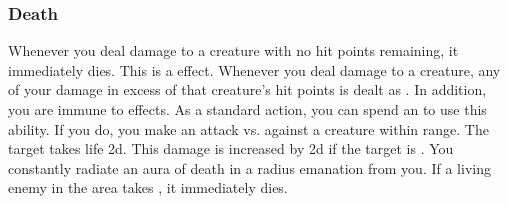         \subsubsection{Death}
             Whenever you deal damage to a creature with no hit points remaining, it immediately dies.
            This is a  effect.
             Whenever you deal damage to a creature, any of your damage in excess of that creature's hit points is dealt as .
            In addition, you are immune to  effects.
             As a standard action, you can spend an  to use this ability.
            If you do, you make an attack vs. against a creature within \rngmed range.
            \hit The target takes life  \plus2d.
            This damage is increased by \plus2d if the target is .
             You constantly radiate an aura of death in a \areahuge radius emanation from you.
            If a living enemy in the area takes , it immediately dies.

